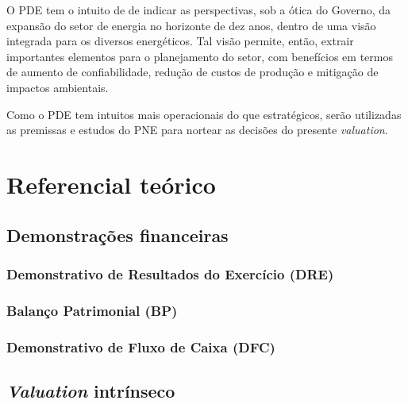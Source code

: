 \documentclass[grad,numbers]{coppe}
\begin{document}
  O PDE tem o intuito de de indicar as perspectivas, sob a ótica do Governo, da expansão do setor de energia no horizonte de dez anos, dentro de uma visão integrada para os diversos energéticos. Tal visão permite, então, extrair importantes elementos para o planejamento do setor, com benefícios em termos de aumento de confiabilidade, redução de custos de produção e mitigação de impactos ambientais.
  
  Como o PDE tem intuitos mais operacionais do que estratégicos, serão utilizadas as premissas e estudos do PNE para nortear as decisões do presente \emph{valuation}.
  
  \hypertarget{referencial-teuxf3rico}{%
  \chapter{Referencial teórico}\label{referencial-teuxf3rico}}
  
  \hypertarget{demonstrauxe7uxf5es-financeiras}{%
  \section{Demonstrações financeiras}\label{demonstrauxe7uxf5es-financeiras}}
  
  \hypertarget{demonstrativo-de-resultados-do-exercuxedcio-dre}{%
  \subsection{Demonstrativo de Resultados do Exercício (DRE)}\label{demonstrativo-de-resultados-do-exercuxedcio-dre}}
  
  \hypertarget{balanuxe7o-patrimonial-bp}{%
  \subsection{Balanço Patrimonial (BP)}\label{balanuxe7o-patrimonial-bp}}
  
  \hypertarget{demonstrativo-de-fluxo-de-caixa-dfc}{%
  \subsection{Demonstrativo de Fluxo de Caixa (DFC)}\label{demonstrativo-de-fluxo-de-caixa-dfc}}
  
  \hypertarget{valuation-intruxednseco}{%
  \section{\texorpdfstring{\emph{Valuation} intrínseco}{Valuation intrínseco}}\label{valuation-intruxednseco}}
  
\end{document}
